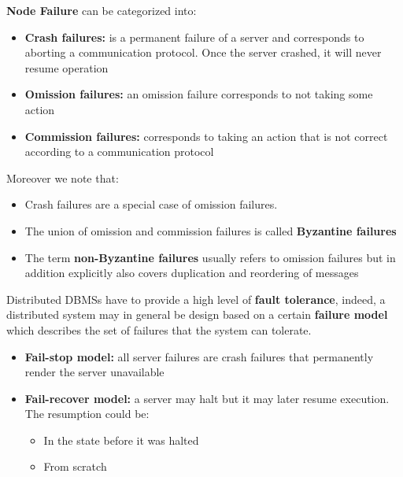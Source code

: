 \textbf{Node Failure} can be categorized into:
\begin{itemize}
    \item \textbf{Crash failures:} is a permanent failure of a server and corresponds to aborting a communication protocol. Once the server crashed, it will never resume operation
    \item \textbf{Omission failures:} an omission failure corresponds to not taking some action
    \item \textbf{Commission failures:} corresponds to taking an action that is not correct according to  a communication protocol
\end{itemize}
Moreover we note that:
\begin{itemize}
    \item Crash failures are a special case of omission failures.
    \item The union of omission and commission failures is called \textbf{Byzantine failures}
    \item The term \textbf{non-Byzantine failures} usually refers to omission failures but in addition explicitly also covers duplication and reordering of messages
\end{itemize}

Distributed DBMSs have to provide a high level of \textbf{fault tolerance}, indeed, a distributed system may in general be design based on a certain \textbf{failure model} which describes the set of failures that the system can tolerate.
\begin{itemize}
    \item \textbf{Fail-stop model:} all server failures are crash failures that permanently render the server unavailable 
    \item \textbf{Fail-recover model:} a server may halt but it may later resume execution. The resumption could be:
    \begin{itemize}
        \item In the state before it was halted
        \item From scratch
    \end{itemize}
\end{itemize}

